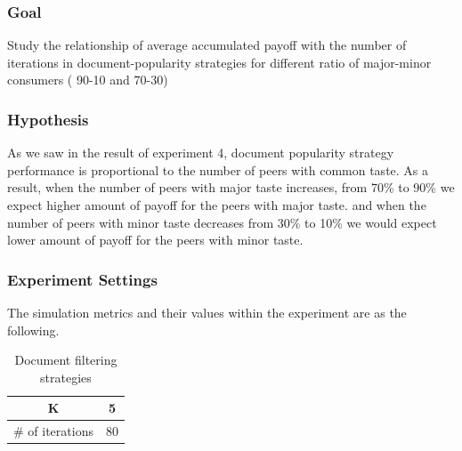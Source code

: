 \documentclass [12pt]{article} \usepackage{multicol}
\begin{document}
\subsubsection{Goal}
 Study the relationship of average accumulated payoff with the number of iterations  
in document-popularity strategies for different ratio of major-minor consumers ( 90-10 and 70-30)

\subsubsection{Hypothesis}

As we saw in the result of experiment 4, document popularity strategy performance is proportional to  the number of peers with common taste.
As a result, when the number of peers with major taste increases, from 70\% to 90\% we expect higher amount of payoff for the peers with major taste.
and when the number of peers with minor taste decreases from 30\% to 10\% we would expect lower amount of payoff for the peers with minor taste.   


\subsubsection{Experiment Settings}

The simulation metrics and their values within the experiment are as the following.

\begin{table}[h!]
\caption{Document filtering strategies}
\begin{center}


\begin{tabular}{|c|c|}
\hline
K   & 5 \\ \hline
\# of iterations & 80 \\ \hline
\end{tabular}


\end{center}
\label{default}
\end{table}
\end{document}
